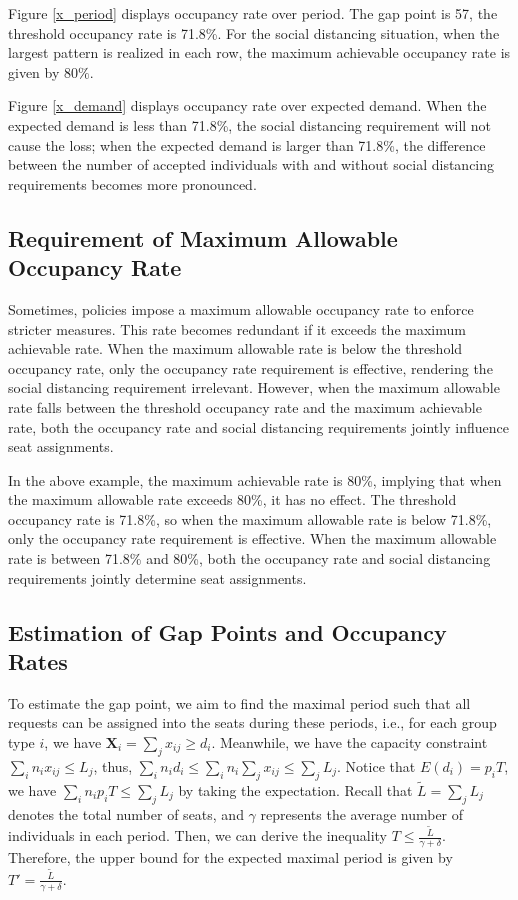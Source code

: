 Figure \ref{x_period} displays occupancy rate over period. The gap point is 57, the threshold occupancy rate is 71.8\%. For the social distancing situation, when the largest pattern is realized in each row, the maximum achievable occupancy rate is given by $80\%$.

Figure \ref{x_demand} displays occupancy rate over expected demand. When the expected demand is less than 71.8\%, the social distancing requirement will not cause the loss; when the expected demand is larger than 71.8\%, the difference between the number of accepted individuals with and without social distancing requirements becomes more pronounced.

\subsection*{Requirement of Maximum Allowable Occupancy Rate}
Sometimes, policies impose a maximum allowable occupancy rate to enforce stricter measures. This rate becomes redundant if it exceeds the maximum achievable rate. When the maximum allowable rate is below the threshold occupancy rate, only the occupancy rate requirement is effective, rendering the social distancing requirement irrelevant. However, when the maximum allowable rate falls between the threshold occupancy rate and the maximum achievable rate, both the occupancy rate and social distancing requirements jointly influence seat assignments.

In the above example, the maximum achievable rate is 80\%, implying that when the maximum allowable rate exceeds 80\%, it has no effect. The threshold occupancy rate is 71.8\%, so when the maximum allowable rate is below 71.8\%, only the occupancy rate requirement is effective. When the maximum allowable rate is between 71.8\% and 80\%, both the occupancy rate and social distancing requirements jointly determine seat assignments.


\subsection{Estimation of Gap Points and Occupancy Rates}
To estimate the gap point, we aim to find the maximal period such that all requests can be assigned into the seats during these periods, i.e., for each group type $i$, we have $\bm{X}_{i} = \sum_{j} x_{ij} \geq d_i$. Meanwhile, we have the capacity constraint $\sum_{i} n_{i} x_{ij} \leq L_j$, thus, $\sum_{i} n_i d_i \leq \sum_{i} n_i \sum_{j} x_{ij} \leq \sum_{j} L_{j}$. Notice that $E(d_i) = p_i T$, we have $\sum_{i} n_i p_i T \leq \sum_{j} L_{j}$ by taking the expectation. Recall that $\tilde{L} = \sum_{j} L_{j}$ denotes the total number of seats, and $\gamma$ represents the average number of individuals in each period. Then, we can derive the inequality $T \leq \frac{\tilde{L}}{\gamma + \delta}$. Therefore, the upper bound for the expected maximal period is given by $T' = \frac{\tilde{L}}{\gamma + \delta}$.

